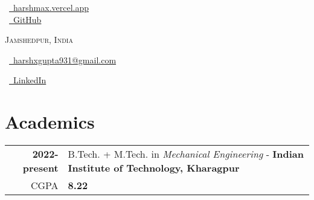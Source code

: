 \documentclass[a4paper,10pt]{extarticle} %
\begin{document}
\pagestyle{empty} %

\begin{multicols}{3}

\normalsize  \faGlobe\ {\href{https://harshmax.vercel.app/}{\  harshmax.vercel.app}}\\
\normalsize \faGithub\ {\href{https://github.com/Harsh-cyber005}{\  GitHub}}\\
\columnbreak
\normalsize\par{\centering{\huge\textsc{\textcolor{primary}{Harsh Gupta}}}\par} 
\par{\centering\normalsize {\textsc{Jamshedpur, India}}\hfill\par}
\columnbreak
\raggedright\hfill\normalsize \faEnvelope\ {\href{mailto:harshxgupta931@gmail.com}{\  harshxgupta931@gmail.com}}\\
\raggedright\hfill\normalsize \faLinkedinSquare\ {\href{https://www.linkedin.com/in/harshmax-dev}{\  LinkedIn}}\\
\end{multicols}
\vspace{-0.4 cm}

\section{\textcolor{primary}{Academics}}
\vspace{+0.1cm}

\begin{tabular}{r|p{17.5cm}}	

 \textbf{2022-present} & B.Tech. + M.Tech. in \textit{Mechanical Engineering} - \textbf{Indian Institute of Technology, Kharagpur}\\
 \hfill CGPA & \textbf{8.22}\\

 
\end{tabular}
\end{document}
